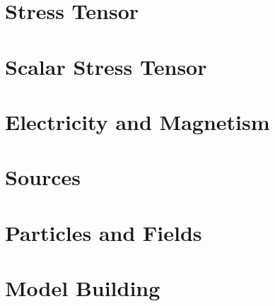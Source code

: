 \section{Stress Tensor}\label{sec:JFrank_CFT_3.4}

\section{Scalar Stress Tensor}\label{sec:JFrank_CFT_3.5}

\section{Electricity and Magnetism}\label{sec:JFrank_CFT_3.6}

\section{Sources}\label{sec:JFrank_CFT_3.7}

\section{Particles and Fields}\label{sec:JFrank_CFT_3.8}

\section{Model Building}\label{sec:JFrank_CFT_3.9}
